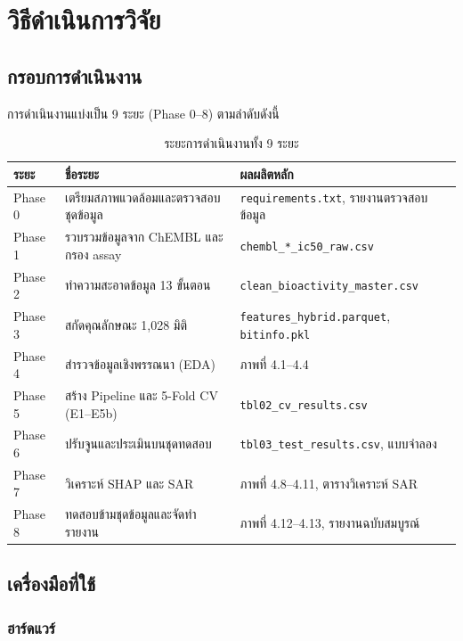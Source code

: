 \chapter{วิธีดำเนินการวิจัย}

\section{กรอบการดำเนินงาน}

การดำเนินงานแบ่งเป็น 9 ระยะ (Phase 0--8) ตามลำดับดังนี้

\begin{table}[H]
\centering
\caption{ระยะการดำเนินงานทั้ง 9 ระยะ}
\label{tab:phases}
\begin{tabular}{C{1.6cm} L{5.6cm} L{6.4cm}}
\toprule
\textbf{ระยะ} & \textbf{ชื่อระยะ} & \textbf{ผลผลิตหลัก}\\
\midrule
Phase 0 & เตรียมสภาพแวดล้อมและตรวจสอบชุดข้อมูล & \texttt{requirements.txt}, รายงานตรวจสอบข้อมูล\\
Phase 1 & รวบรวมข้อมูลจาก ChEMBL และกรอง assay & \texttt{chembl\_*\_ic50\_raw.csv}\\
Phase 2 & ทำความสะอาดข้อมูล 13 ขั้นตอน & \texttt{clean\_bioactivity\_master.csv}\\
Phase 3 & สกัดคุณลักษณะ 1{,}028 มิติ & \texttt{features\_hybrid.parquet}, \texttt{bitinfo.pkl}\\
Phase 4 & สำรวจข้อมูลเชิงพรรณนา (EDA) & ภาพที่ 4.1--4.4\\
Phase 5 & สร้าง Pipeline และ 5-Fold CV (E1--E5b) & \texttt{tbl02\_cv\_results.csv}\\
Phase 6 & ปรับจูนและประเมินบนชุดทดสอบ & \texttt{tbl03\_test\_results.csv}, แบบจำลอง\\
Phase 7 & วิเคราะห์ SHAP และ SAR & ภาพที่ 4.8--4.11, ตารางวิเคราะห์ SAR\\
Phase 8 & ทดสอบข้ามชุดข้อมูลและจัดทำรายงาน & ภาพที่ 4.12--4.13, รายงานฉบับสมบูรณ์\\
\bottomrule
\end{tabular}
\end{table}

\section{เครื่องมือที่ใช้}

\subsection{ฮาร์ดแวร์}

